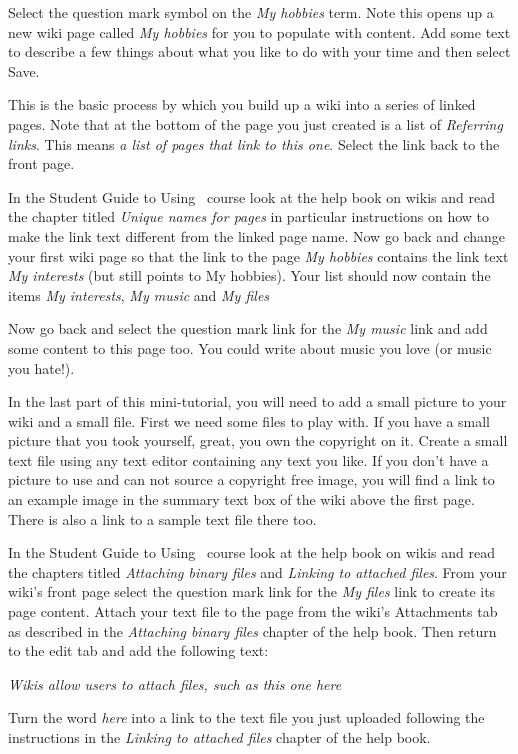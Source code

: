 Select the question mark symbol on the \emph{My hobbies} term. Note this opens up a new wiki page called \emph{My hobbies} for you to populate with content. Add some text to describe a few things about what you like to do with your time and then select Save.

This is the basic process by which you build up a wiki into a series of linked pages. Note that at the bottom of the page you just created is a list of \emph{Referring links}.  This means \emph{a list of pages that link to this one}.  Select the link back to the front page.

In the Student Guide to Using \moodle\ course look at the help book on wikis and read the chapter titled \emph{Unique names for pages}  in particular instructions on how to make the link text different from the linked page name. Now go back and change your first wiki page so that the link to the page \emph{My hobbies} contains the link text \emph{My interests} (but still points to My hobbies). Your list should now contain the items \emph{My interests},  \emph{My music}  and \emph{My files} 

Now go back and select the question mark link for the \emph{My music} link and add some content to this page too. You could write about music you love (or music you hate!).

In the last part of this mini-tutorial, you will need to add a small picture to your wiki and a small file. First we need some files to play with. If you have a small picture that you took yourself, great, you own the copyright on it. Create a small text file using any text editor containing any text you like. If you don't have a picture to use and can not source a copyright free image, you will find a link to an example image in the summary text box of the wiki above the first page. There is also a link to a sample text file there too.

In the Student Guide to Using \moodle\ course look at the help book on wikis and read the chapters titled \emph{Attaching binary files} and \emph{Linking to attached files}.  From your wiki's front page select the question mark link for the \emph{My files} link to create its page content. Attach your text file to the page from the wiki's Attachments tab as described in the \emph{Attaching binary files} chapter of the help book. Then return to the edit tab and add the following text:

\emph{Wikis allow users to attach files, such as this one here}  

Turn the word \emph{here} into a link to the text file you just uploaded following the instructions in the \emph{Linking to attached files} chapter of the help book.

